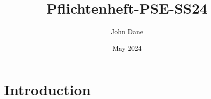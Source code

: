 \documentclass{article}
\title{Pflichtenheft-PSE-SS24}
\author{John Dane}
\date{May 2024}
\begin{document}
\maketitle

\section{Introduction}
\end{document}
